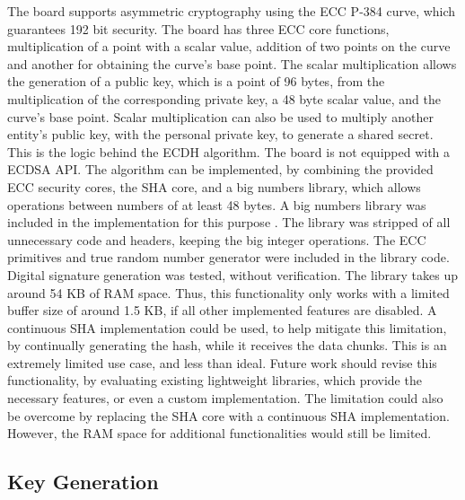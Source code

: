 The board supports asymmetric cryptography using the ECC P-384 curve, which guarantees 192 bit security. The board has three ECC core functions, multiplication of a point with a scalar value, addition of two points on the curve and another for obtaining the curve's base point. The scalar multiplication allows the generation of a public key, which is a point of 96 bytes, from the multiplication of the corresponding private key, a 48 byte scalar value, and the curve's base point. Scalar multiplication can also be used to multiply another entity's public key, with the personal private key, to generate a shared secret. This is the logic behind the ECDH algorithm.
The board is not equipped with a \ac{ECDSA} API. The algorithm can be implemented, by combining the provided ECC security cores, the SHA core, and a big numbers library, which allows operations between numbers of at least 48 bytes.
A big numbers library was included in the implementation for this purpose \cite{libecc}. The library was stripped of all unnecessary code and headers, keeping the big integer operations. The ECC primitives and true random number generator were included in the library code. Digital signature generation was tested, without verification. The library takes up around 54 KB of RAM space. Thus, this functionality only works with a limited buffer size of around 1.5 KB, if all other implemented features are disabled. A continuous SHA implementation could be used, to help mitigate this limitation, by continually generating the hash, while it receives the data chunks.
This is an extremely limited use case, and less than ideal. Future work should revise this functionality, by evaluating existing lightweight libraries, which provide the necessary features, or even a custom implementation. The limitation could also be overcome by replacing the SHA core with a continuous SHA implementation. However, the RAM space for additional functionalities would still be limited.

\subsection{Key Generation}\label{chap:implementation:services:key-generation}

